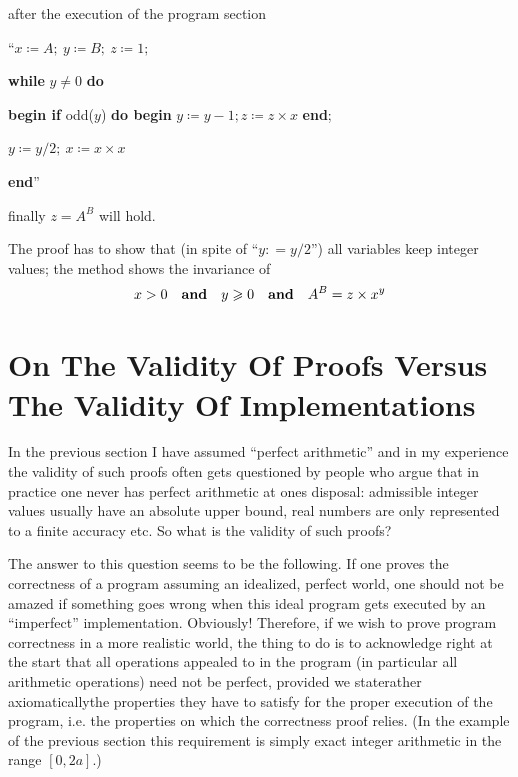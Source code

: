 \documentclass[twoside,11pt]{book}
\begin{document}
\begin{enumerate}[wide, nosep, label=\textit{Remark }\arabic*.]
	\noindent
	after the execution of the program section
	
	{
		\setlength{\parindent}{8em}
		\hspace{-.4em}``$x \coloneq A;\ y \coloneq B;\ z \coloneq 1;$
		
		\textbf{while} $y \neq 0$ \textbf{do}
		
		\quad\textbf{begin if} odd($y$) \textbf{do begin} $y \coloneq y - 1; z \coloneq z \times x$ \textbf{end};
		
		\quad\quad $y \coloneq y/2;\ x \coloneq x \times x$
		
		\quad\textbf{end}''
	}
	
	\noindent
	finally $z = A^B$ will hold.
\end{enumerate}

The proof has to show that (in spite of ``$y: = y/2$'') all variables keep integer values; the method shows the invariance of
$$
x > 0\quad \text{\textbf{and}}\quad y \geqslant 0\quad \text{\textbf{and}}\quad A^B = z \times x^y
$$

\section[On the validity of proofs versus the validity of implementations]{On The Validity Of Proofs Versus The Validity Of Implementations}

In the previous section I have assumed ``perfect arithmetic'' and in my experience the validity of such proofs often gets questioned by people who argue that in practice one never has perfect arithmetic at ones disposal: admissible integer values usually have an absolute upper bound, real numbers are only represented to a finite accuracy etc. So what is the validity of such proofs?

The answer to this question seems to be the following. If one proves the correctness of a program assuming an idealized, perfect world, one should not be amazed if something goes wrong when this ideal program gets executed by an ``imperfect'' implementation. Obviously! Therefore, if we wish to prove program correctness in a more realistic world, the thing to do is to acknowledge right at the start that all operations appealed to in the program (in particular all arithmetic operations) need not be perfect, provided we state\textemdash{}rather axiomatically\textemdash{}the properties they have to satisfy for the proper execution of the program, i.e. the properties on which the correctness proof relies. (In the example of the previous section this requirement is simply exact integer arithmetic in the range $[0, 2a]$.)
\end{document}
